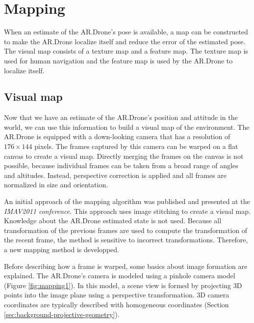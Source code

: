 	\section{Mapping}
	\label{sec:mapping}
When an estimate of the AR.Drone's pose is available, a map can be constructed to make the AR.Drone localize itself and reduce the error of the estimated pose.
The visual map consists of a texture map and a feature map.
The texture map is used for human navigation and the feature map is used by the AR.Drone to localize itself.

	\subsection{Visual map}
\label{sec:texture_map}
Now that we have an estimate of the AR.Drone's position and attitude in the world, we can use this information to build a visual map of the environment.
The AR.Drone is equipped with a down-looking camera that has a resolution of $176 \times 144$ pixels.
The frames captured by this camera can be warped on a flat canvas to create a visual map.
Directly merging the frames on the canvas is not possible, because individual frames can be taken from a broad range of angles and altitudes.
Instead, perspective correction is applied and all frames are normalized in size and orientation.

An initial approach of the mapping algorithm was published \cite{visser2011closing} and presented at the \textit{IMAV2011 conference}.
This approach uses image stitching \cite{levin2004seamless} to create a visual map.
Knowledge about the AR.Drone estimated state is not used.
Because all transformation of the previous frames are used to compute the transformation of the recent frame, the method is sensitive to incorrect transformations.
Therefore, a new mapping method is developped.

Before describing how a frame is warped, some basics about image formation are explained. %
The AR.Drone's camera is modeled using a pinhole camera model (Figure \ref{fig:mapping1}).
In this model, a scene view is formed by projecting 3D points into the image plane using a perspective transformation.
3D camera coordinates are typically described with homogeneous coordinates (Section \ref{sec:background-projective-geometry}).

